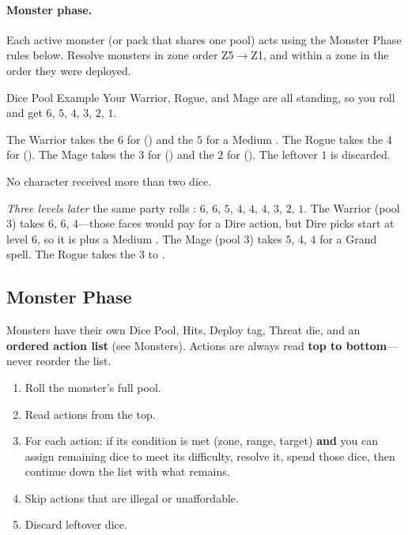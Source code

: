 \paragraph{Monster phase.}
Each active monster (or pack that shares one pool) acts using the Monster Phase rules below. Resolve monsters in zone order Z5$\rightarrow$Z1, and within a zone in the order they were deployed.

\begin{rpgbox}{Dice Pool Example}
    Your Warrior, Rogue, and Mage are all standing, so you roll  and get
    $6$, $5$, $4$, $3$, $2$, $1$.

    The Warrior takes the $6$ for  (\hard) and the $5$ for a Medium .
    The Rogue takes the $4$ for  (\medium).
    The Mage takes the $3$ for  (\easy) and the $2$ for  (\negligible).
    The leftover $1$ is discarded.

    No character received more than two dice.

    \textit{Three levels later} the same party rolls : $6$, $6$, $5$, $4$, $4$, $4$, $3$, $2$, $1$. The Warrior (pool 3) takes $6$, $6$, $4$---those faces would pay for a Dire action, but Dire picks start at level 6, so it is  plus a Medium . The Mage (pool 3) takes $5$, $4$, $4$ for a Grand spell. The Rogue takes the $3$ to .
\end{rpgbox}

\subsection{Monster Phase}

Monsters have their own Dice Pool, Hits, Deploy tag, Threat die, and an \textbf{ordered action list} (see Monsters). Actions are always read \textbf{top to bottom}---never reorder the list.

\begin{enumerate}
    \item Roll the monster's full pool.
    \item Read actions from the top.
    \item For each action: if its condition is met (zone, range, target) \textbf{and} you can assign remaining dice to meet its difficulty, resolve it, spend those dice, then continue down the list with what remains.
    \item Skip actions that are illegal or unaffordable.
    \item Discard leftover dice.
\end{enumerate}


